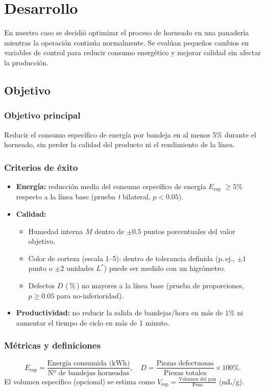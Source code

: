 \section{Desarrollo}
En nuestro caso se decidió optimizar el proceso de horneado en una panadería mientras la operación continúa normalmente. Se evalúan pequeños cambios en variables de control para reducir consumo energético y mejorar calidad sin afectar la producción.

\subsection{Objetivo}

\subsubsection*{Objetivo principal}
Reducir el consumo específico de energía por bandeja en al menos 5\% durante el horneado, sin perder la calidad del producto ni el rendimiento de la línea.

\subsubsection*{Criterios de éxito}
\begin{itemize}
  \item \textbf{Energía:} reducción media del consumo específico de energía $E_{\mathrm{esp}}$ $\geq 5\% $ respecto a la línea base (prueba \textit{t} bilateral, $p<0{.}05$).
  \item \textbf{Calidad:} 
    \begin{itemize}
      \item Humedad interna $M$ dentro de $\pm 0{.}5$ puntos porcentuales del valor objetivo.
      \item Color de corteza (escala 1--5): dentro de tolerancia definida (p.\,ej., $\pm 1$ punto o $\pm 2$ unidades $L^*$) puede ser medido con un higrómetro.
      \item Defectos $D$ (\,\%\,)  no mayores a la línea base (prueba de proporciones, $p\ge 0{.}05$ para no-inferioridad).
    \end{itemize}
  \item \textbf{Productividad:} no reducir la salida de bandejas/hora en más de $1\%$ ni aumentar el tiempo de ciclo en más de 1 minuto.
\end{itemize}

\subsubsection*{Métricas y definiciones}
\[
E_{\mathrm{esp}}=\frac{\text{Energía consumida (kWh)}}{\text{Nº de bandejas horneadas}},\quad
D=\frac{\text{Piezas defectuosas}}{\text{Piezas totales}}\times 100\%.
\]
El volumen específico (opcional) se estima como $V_{\mathrm{esp}}=\frac{\text{Volumen del pan}}{\text{Peso}}$ (mL/g). 


